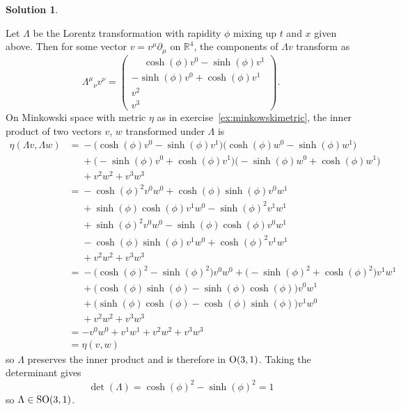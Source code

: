 \documentclass[11pt, a4paper]{report}
\theoremstyle{definition}
\newtheorem{sol}{Solution}[part]
\renewcommand*{\O}{\ensuremath\text{O}}
\newcommand*{\SO}{\ensuremath\text{SO}}
\begin{document}
\begin{sol}\label{sol:so31lorentztransformations}

Let $\Lambda$ be the Lorentz transformation with rapidity $\phi$ mixing up $t$ and $x$ given above.
Then for some vector $v = v^\mu \partial_\mu$ on $\mathbb{R}^4$, the components of $\Lambda v$ transform as
\[
    {\Lambda^\mu}_\nu v^\nu = \begin{pmatrix}
        \phantom{-} \cosh(\phi) v^0 - \sinh(\phi) v^1 \\
        -\sinh(\phi) v^0 + \cosh(\phi) v^1 \\
        v^2 \\
        v^3
    \end{pmatrix}.
\]
On Minkowski space with metric $\eta$ as in exercise~\ref{ex:minkowskimetric}, the inner product of two vectors $v$, $w$ transformed under $\Lambda$ is
\begin{align*}
    \eta(\Lambda v, \Lambda w)
        &\mathrel{=}{} - \bigl(\cosh(\phi) v^0 - \sinh(\phi) v^1 \bigr)
            \bigl( \cosh(\phi) w^0 - \sinh(\phi) w^1 \bigr) \\
        &\mathrel{\phantom{=}}{} + \bigl(-\sinh(\phi) v^0 + \cosh(\phi) v^1 \bigr)
                                   \bigl(-\sinh(\phi) w^0 + \cosh(\phi) w^1 \bigr) \\
        &\mathrel{\phantom{=}}{} + v^2 w^2 + v^3 w^3 \\
        &\mathrel{=}{} - {\cosh(\phi)}^2 v^0 w^0 + \cosh(\phi) \sinh(\phi) v^0 w^1 \\
        &\mathrel{\phantom{=}}{} + \sinh(\phi) \cosh(\phi) v^1 w^0 - {\sinh(\phi)}^2 v^1 w^1 \\
        &\mathrel{\phantom{=}}{} + {\sinh(\phi)}^2 v^0 w^0 - \sinh(\phi) \cosh(\phi) v^0 w^1 \\
        &\mathrel{\phantom{=}}{} - \cosh(\phi) \sinh(\phi) v^1 w^0 + {\cosh(\phi)}^2 v^1 w^1 \\
        &\mathrel{\phantom{=}}{} + v^2 w^2 + v^3 w^3 \\
        &\mathrel{=}{} - \bigl( {\cosh(\phi)}^2 - {\sinh(\phi)}^2 \bigr) v^0 w^0
                       + \bigl( -{\sinh(\phi)}^2 + {\cosh(\phi)}^2) v^1 w^1 \\
        &\mathrel{\phantom{=}}{} + \bigl( \cosh(\phi) \sinh(\phi) - \sinh(\phi) \cosh(\phi) \bigr) v^0 w^1 \\
        &\mathrel{\phantom{=}}{} + \bigl( \sinh(\phi) \cosh(\phi) - \cosh(\phi) \sinh(\phi) \bigr) v^1 w^0 \\
        &\mathrel{\phantom{=}}{} + v^2 w^2 + v^3 w^3 \\
        &= - v^0 w^0 + v^1 w^1 + v^2 w^2 + v^3 w^3 \\
        &= \eta(v, w)
\end{align*}
so $\Lambda$ preserves the inner product and is therefore in $\O(3, 1)$.
Taking the determinant gives
\[
    \det(\Lambda) = {\cosh(\phi)}^2 - {\sinh(\phi)}^2 = 1
\]
so $\Lambda \in \SO(3, 1)$.


\end{sol}
\end{document}
